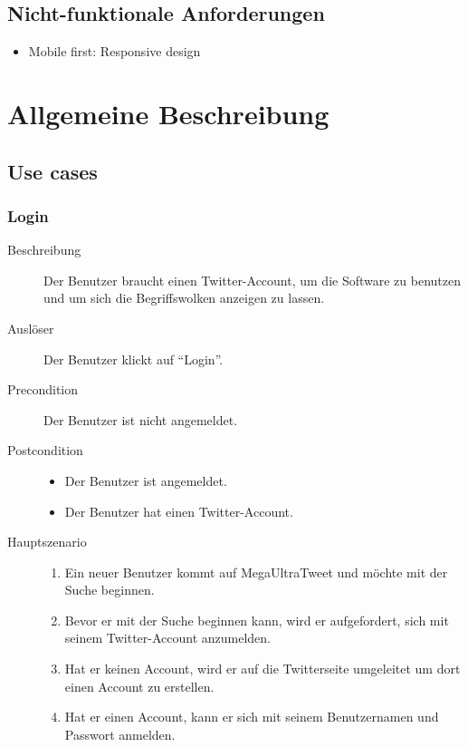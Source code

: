 \documentclass[a4wide]{article}
\begin{document}

\subsection{Nicht-funktionale Anforderungen}
\begin{itemize}
\item Mobile first: Responsive design
\end{itemize}
\section{Allgemeine Beschreibung}
\subsection{Use cases}

\newcommand{\usecase}[2][(Name)]{
	\subsubsection{#1}
	\begin{description}
		#2
	\end{description}
}

\usecase[Login]{
	\item[Beschreibung] Der Benutzer braucht einen Twitter-Account, um die Software zu benutzen und um sich die Begriffswolken anzeigen zu lassen.
	\item[Ausl\"oser] Der Benutzer klickt auf \enquote{Login}.
	\item[Precondition] Der Benutzer ist nicht angemeldet.
	\item[Postcondition] 
	\begin{itemize}
		\item Der Benutzer ist angemeldet.
		\item Der Benutzer hat einen Twitter-Account.
	\end{itemize}
	\item[Hauptszenario]
	\begin{enumerate}
		\item Ein neuer Benutzer kommt auf MegaUltraTweet und möchte mit der Suche beginnen.
		\item Bevor er mit der Suche beginnen kann, wird er aufgefordert, sich mit seinem Twitter-Account anzumelden.
		\item Hat er keinen Account, wird er auf die Twitterseite umgeleitet um dort einen Account zu erstellen.
		\item Hat er einen Account, kann er sich mit seinem Benutzernamen und Passwort anmelden.
	\end{enumerate}
	}
	
\end{document}
